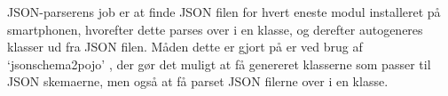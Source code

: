 JSON-parserens job er at finde JSON filen for hvert eneste modul installeret på smartphonen, hvorefter dette parses over i en klasse, og derefter autogeneres klasser ud fra JSON filen.
Måden dette er gjort på er ved brug af `jsonschema2pojo' \citep{jsonpojo}, der gør det muligt at få genereret klasserne som passer til JSON skemaerne, men også at få parset JSON filerne over i en klasse. 